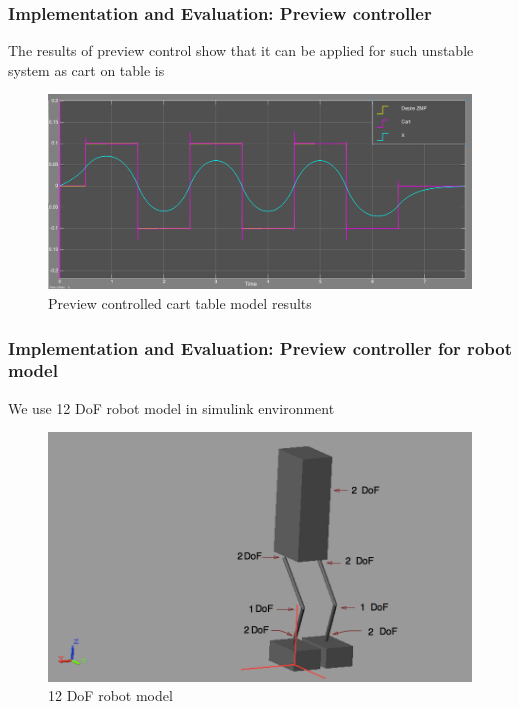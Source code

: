 \documentclass{beamer}
\begin{document}

	\begin{frame}
		\frametitle{Implementation and Evaluation: Preview controller}
		The results of preview control show that it can be applied for such unstable system as cart on table is
		
		\begin{figure}[h!]
			\centering
			\includegraphics[width=0.8\linewidth]{presentation_images/24}
			\caption{Preview controlled cart table model results}
		\end{figure}
	\end{frame}
	

	\begin{frame}
		\frametitle{Implementation and Evaluation: Preview controller for robot model}
		We use 12 DoF robot model in simulink environment
		
		\begin{figure}[h!]
			\centering
			\includegraphics[width=0.8\linewidth]{presentation_images/25}
			\caption{12 DoF robot model}
		\end{figure}
	\end{frame}
	
\end{document}
